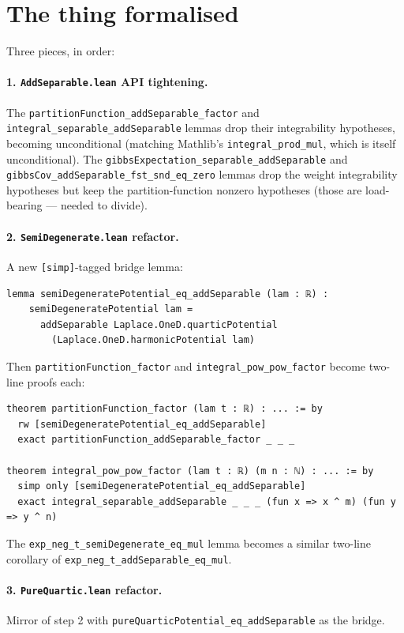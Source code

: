 \documentclass[11pt]{article}
\begin{document}
\section{The thing formalised}

Three pieces, in order:

\paragraph{1. \texttt{AddSeparable.lean} API tightening.}
The \texttt{partitionFunction\_addSeparable\_factor} and
\texttt{integral\_separable\_addSeparable} lemmas drop their
integrability hypotheses, becoming unconditional (matching Mathlib's
\texttt{integral\_prod\_mul}, which is itself unconditional). The
\texttt{gibbsExpectation\_separable\_addSeparable} and
\texttt{gibbsCov\_addSeparable\_fst\_snd\_eq\_zero} lemmas drop the
weight integrability hypotheses but keep the partition-function
nonzero hypotheses (those are load-bearing --- needed to divide).

\paragraph{2. \texttt{SemiDegenerate.lean} refactor.}
A new \texttt{[simp]}-tagged bridge lemma:
\begin{verbatim}
lemma semiDegeneratePotential_eq_addSeparable (lam : ℝ) :
    semiDegeneratePotential lam =
      addSeparable Laplace.OneD.quarticPotential
        (Laplace.OneD.harmonicPotential lam)
\end{verbatim}
Then \texttt{partitionFunction\_factor} and
\texttt{integral\_pow\_pow\_factor} become two-line proofs each:
\begin{verbatim}
theorem partitionFunction_factor (lam t : ℝ) : ... := by
  rw [semiDegeneratePotential_eq_addSeparable]
  exact partitionFunction_addSeparable_factor _ _ _

theorem integral_pow_pow_factor (lam t : ℝ) (m n : ℕ) : ... := by
  simp only [semiDegeneratePotential_eq_addSeparable]
  exact integral_separable_addSeparable _ _ _ (fun x => x ^ m) (fun y => y ^ n)
\end{verbatim}
The \texttt{exp\_neg\_t\_semiDegenerate\_eq\_mul} lemma becomes a
similar two-line corollary of
\texttt{exp\_neg\_t\_addSeparable\_eq\_mul}.

\paragraph{3. \texttt{PureQuartic.lean} refactor.}
Mirror of step 2 with \texttt{pureQuarticPotential\_eq\_addSeparable}
as the bridge.
\end{document}
